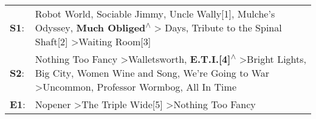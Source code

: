 \begin{supertabular}{p{0.03\textwidth}p{0.92\textwidth}}
 \textbf{S1}:  &                                                          Robot World\textsuperscript{}, \enspace Sociable Jimmy\textsuperscript{}, \enspace Uncle Wally[1]\textsuperscript{}, \enspace Mulche's Odyssey\textsuperscript{}, \enspace \textbf{Much Obliged\textsuperscript{$\wedge$}} \textgreater {} Days\textsuperscript{}, \enspace Tribute to the Spinal Shaft[2]\textsuperscript{} \textgreater \enspace Waiting Room[3]\textsuperscript{}  \enspace  \\
 \textbf{S2}:  &  Nothing Too Fancy\textsuperscript{} \textgreater \enspace Walletsworth\textsuperscript{}, \enspace \textbf{E.T.I.[4]\textsuperscript{$\wedge$}} \textgreater \enspace Bright Lights, Big City\textsuperscript{}, \enspace Women Wine and Song\textsuperscript{}, \enspace We're Going to War\textsuperscript{} \textgreater \enspace Uncommon\textsuperscript{}, \enspace Professor Wormbog\textsuperscript{}, \enspace All In Time\textsuperscript{}  \enspace  \\
 \textbf{E1}:  &                                                                                                                                                                                                                                                                                                         Nopener\textsuperscript{} \textgreater \enspace The Triple Wide[5]\textsuperscript{} \textgreater \enspace Nothing Too Fancy\textsuperscript{}  \enspace  \\
\end{supertabular}
